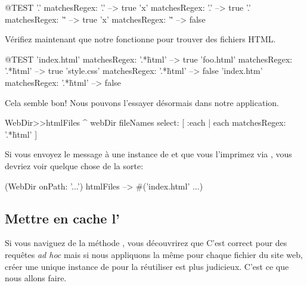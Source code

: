 \documentclass[a4paper,10pt,twoside]{book}
\begin{document}
\begin{code}{@TEST}
'.' matchesRegex: '.'   --> true
'x' matchesRegex: '.'  --> true
'.' matchesRegex: '\.'  --> true
'x' matchesRegex: '\.' --> false
\end{code}

Vérifiez maintenant que notre \expreg fonctionne pour trouver des fichiers
HTML.

\begin{code}{@TEST}
'index.html' matchesRegex: '.*\.html' --> true
'foo.html' matchesRegex: '.*\.html'    --> true
'style.css' matchesRegex: '.*\.html'   --> false
'index.htm' matchesRegex: '.*\.html' --> false
\end{code}

Cela semble bon! Nous pouvons l'essayer désormais dans notre application. 


\begin{code}{}
WebDir>>htmlFiles
	^ webDir fileNames select: [ :each | each matchesRegex: '.*\.html' ]
\end{code}

Si vous envoyez le message  à une instance de
 et que vous l'imprimez via , vous devriez
voir quelque chose de la sorte:

\begin{code}{}
(WebDir onPath: '...') htmlFiles --> #('index.html' ...)
\end{code}

\subsection{Mettre en cache l'\expreg}

Si vous naviguez de la méthode , vous
découvrirez que 
C'est correct pour des requêtes \emph{ad hoc} mais si nous appliquons
la même \expreg pour chaque fichier du site web, créer une unique
instance de  pour la réutiliser est plus judicieux.
C'est ce que nous allons faire.
\end{document}
